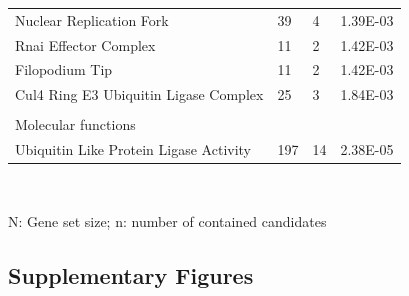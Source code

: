 \begin{refsection}
\begin{table}[H]
\begin{tabular}{@{}llll@{}}
Nuclear Replication Fork               & 39   & 4  & 1.39E-03         \\
Rnai Effector Complex                  & 11   & 2  & 1.42E-03         \\
Filopodium Tip                         & 11   & 2  & 1.42E-03         \\
Cul4 Ring E3 Ubiquitin Ligase Complex  & 25   & 3  & 1.84E-03         \\
                                       &      &    &                  \\
Molecular functions                    &      &    &                  \\
Ubiquitin Like Protein Ligase Activity & 197  & 14 & 2.38E-05         \\ \hline
\end{tabular}\\
{\begin{flushleft}
\scriptsize N: Gene set size; n: number of contained candidates
\end{flushleft}}
\end{table}


\newpage
\subsection*{Supplementary Figures}


\end{refsection}
